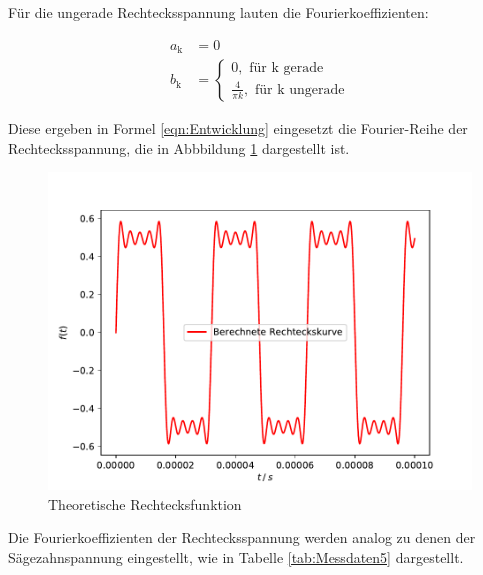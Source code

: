 Für die ungerade Rechtecksspannung lauten die Fourierkoeffizienten:

\begin{align*}
    a_\text{k} &= 0 \\
    b_\text{k} &= 
        \begin{cases} 
            0, \text{ für k gerade} \\ \frac{4}{\pi k}, \text{ für k ungerade}
        \end{cases}
\end{align*}

Diese ergeben in Formel \eqref{eqn:Entwicklung} eingesetzt die Fourier-Reihe
der Rechtecksspannung, die in Abbbildung \ref{fig:Theo2}  dargestellt ist.

\begin{figure}[H]
    \centering
    \includegraphics[scale = 0.6]{content/plot5.pdf}
    \caption{Theoretische Rechtecksfunktion}
    \label{fig:Theo2}
\end{figure}

Die Fourierkoeffizienten der Rechtecksspannung werden analog zu denen der Sägezahnspannung
eingestellt, wie in Tabelle \ref{tab:Messdaten5} dargestellt. 

